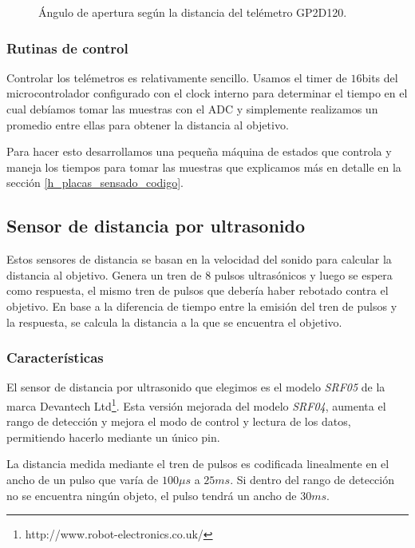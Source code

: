 \begin{figure}[ht]
\begin{minipage}[b]{0.5\linewidth}
		\caption{\'Angulo de apertura seg\'un la distancia del tel\'emetro GP2D120.}
		\label{hF_gp2d120_apertura}
	\end{minipage}
\end{figure}

\subsubsection{Rutinas de control}
\label{h_sensado_telemetros_rutinas}

Controlar los tel\'emetros es relativamente sencillo.
Usamos el timer de $16$bits del microcontrolador configurado con el clock interno para determinar el tiempo en el cual
deb\'iamos tomar las muestras con el ADC y simplemente realizamos un promedio entre ellas para obtener la distancia al objetivo.

Para hacer esto desarrollamos una peque\~na m\'aquina de estados que controla y maneja los tiempos para tomar las muestras que
explicamos m\'as en detalle en la secci\'on \ref{h_placas_sensado_codigo}.

\subsection{Sensor de distancia por ultrasonido}
\label{h_sensado_ultrasonido}

Estos sensores de distancia se basan en la velocidad del sonido para calcular la distancia al objetivo.
Genera un tren de $8$ pulsos ultras\'onicos y luego se espera como respuesta, el mismo tren de pulsos que deber\'ia haber rebotado contra el objetivo.
En base a la diferencia de tiempo entre la emisi\'on del tren de pulsos y la respuesta, se calcula la distancia a la que se encuentra el objetivo.

\subsubsection{Caracter\'isticas}
\label{h_sensado_ultrasonido_caracteristicas}

El sensor de distancia por ultrasonido que elegimos es el modelo \emph{SRF05} de la marca Devantech Ltd\footnote{http://www.robot-electronics.co.uk/}.
Esta versi\'on mejorada del modelo \emph{SRF04}, aumenta el rango de detecci\'on y mejora el modo de control y lectura de los datos, permitiendo
hacerlo mediante un \'unico pin.

La distancia medida mediante el tren de pulsos es codificada linealmente en el ancho de un pulso que var\'ia de $100\mu s$ a $25 ms$.
Si dentro del rango de detecci\'on no se encuentra ning\'un objeto, el pulso tendr\'a un ancho de $30ms$.

